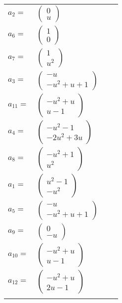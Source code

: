 \documentclass[1p]{elsarticle_modified}
\theoremstyle{definition}
\begin{document}
\begin{tabular}{m{7pt} m{180pt} m{7pt} m{180pt} }
\flushright $a_{2}=$&$\begin{pmatrix}0\\u\end{pmatrix}$ \\
\flushright $a_{6}=$&$\begin{pmatrix}1\\0\end{pmatrix}$ \\
\flushright $a_{7}=$&$\begin{pmatrix}1\\u^2\end{pmatrix}$ \\
\flushright $a_{3}=$&$\begin{pmatrix}- u\\- u^2+u+1\end{pmatrix}$ \\
\flushright $a_{11}=$&$\begin{pmatrix}- u^2+u\\u-1\end{pmatrix}$ \\
\flushright $a_{4}=$&$\begin{pmatrix}- u^2-1\\-2 u^2+3 u\end{pmatrix}$ \\
\flushright $a_{8}=$&$\begin{pmatrix}- u^2+1\\u^2\end{pmatrix}$ \\
\flushright $a_{1}=$&$\begin{pmatrix}u^2-1\\- u^2\end{pmatrix}$ \\
\flushright $a_{5}=$&$\begin{pmatrix}- u\\- u^2+u+1\end{pmatrix}$ \\
\flushright $a_{9}=$&$\begin{pmatrix}0\\- u\end{pmatrix}$ \\
\flushright $a_{10}=$&$\begin{pmatrix}- u^2+u\\u-1\end{pmatrix}$ \\
\flushright $a_{12}=$&$\begin{pmatrix}- u^2+u\\2 u-1\end{pmatrix}$\\&\end{tabular}
\end{document}
